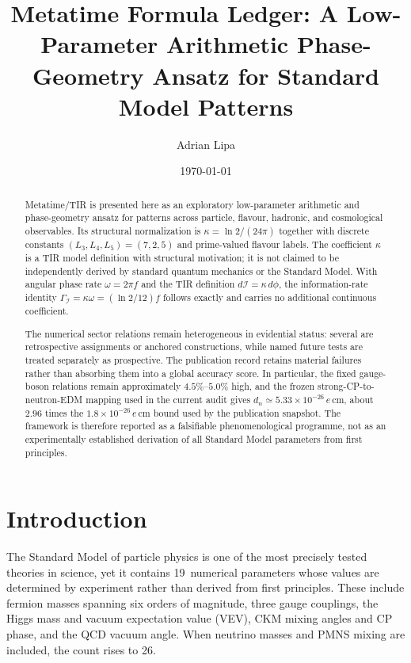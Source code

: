 \documentclass[aps,prd,reprint,twocolumn,showpacs,superscriptaddress]{revtex4-2}
\begin{document}
\title{Metatime Formula Ledger: A Low-Parameter Arithmetic Phase-Geometry Ansatz for Standard Model Patterns}

\author{Adrian Lipa}

\date{\today}

\begin{abstract}
Metatime/TIR is presented here as an exploratory low-parameter arithmetic and
phase-geometry ansatz for patterns across particle, flavour, hadronic, and
cosmological observables.  Its structural normalization is
$\kappa=\ln2/(24\pi)$ together with discrete constants
$(L_3,L_4,L_5)=(7,2,5)$ and prime-valued flavour labels.  The coefficient
$\kappa$ is a TIR model definition with structural motivation; it is not claimed
to be independently derived by standard quantum mechanics or the Standard
Model.  With angular phase rate $\omega=2\pi f$ and the TIR definition
$d\mathcal I=\kappa\,d\phi$, the information-rate identity
$\Gamma_{\mathcal I}=\kappa\omega=(\ln2/12)f$ follows exactly and carries no
additional continuous coefficient.

The numerical sector relations remain heterogeneous in evidential status:
several are retrospective assignments or anchored constructions, while named
future tests are treated separately as prospective.  The publication record
retains material failures rather than absorbing them into a global accuracy
score.  In particular, the fixed gauge-boson relations remain approximately
$4.5\%$--$5.0\%$ high, and the frozen strong-CP-to-neutron-EDM mapping used in
the current audit gives $d_n\simeq5.33\times10^{-26}\,e\,\mathrm{cm}$, about
$2.96$ times the $1.8\times10^{-26}\,e\,\mathrm{cm}$ bound used by the
publication snapshot.  The framework is therefore reported as a falsifiable
phenomenological programme, not as an experimentally established derivation of
all Standard Model parameters from first principles.
\end{abstract}

\maketitle

\section{Introduction}

The Standard Model of particle physics is one of the most precisely tested
theories in science, yet it contains 19~numerical parameters whose values
are determined by experiment rather than derived from first principles.
These include fermion masses spanning six orders of magnitude, three gauge
couplings, the Higgs mass and vacuum expectation value (VEV), CKM mixing
angles and CP phase, and the QCD vacuum angle.  When neutrino masses and
PMNS mixing are included, the count rises to 26.
\end{document}
